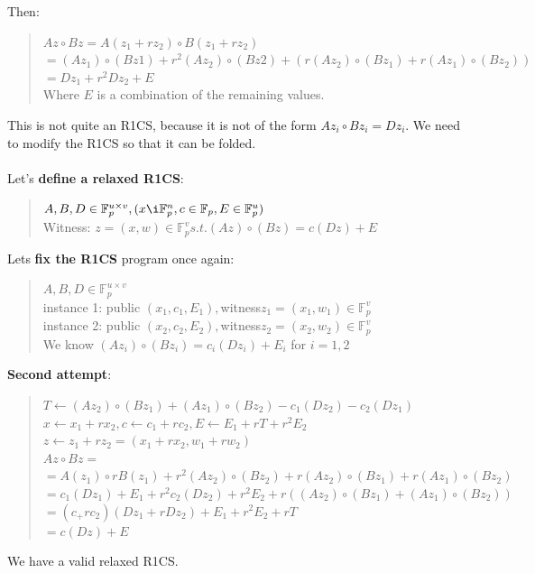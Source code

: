 Then:
\begin{quote}
   $Az \circ Bz = A(z_1 + r z_2) \circ B(z_1 + rz_2)$
   \\
   $= (Az_1) \circ (Bz1) + r^2 (Az_2) \circ (Bz2) + (r(Az_2) \circ (Bz_1) + r(Az_1) \circ (Bz_2))$
   \\
   $=Dz_1 + r^2Dz_2 + E$
   \\
   Where $E$ is a combination of the remaining values.
   \\
\end{quote}
This is not quite an R1CS, because it is not of the form $Az_i \circ Bz_i = Dz_i$.
We need to modify the R1CS so that it can be folded.
\\
\\
Let's \textbf{define a relaxed R1CS}:
\begin{quote}
$A, B,D \in \mathbb{F}^{u \times v}_p, (x \i  \mathbb{F}^n_p, c \in \mathbb{F}_p, E \in \mathbb{F}^u_p) $
\\
Witness: $ z = (x,w) \in \mathbb{F}^v_p s.t. (Az) \circ (Bz) = c(Dz) + E$
\end{quote}
Lets \textbf{fix the R1CS} program once again:
\begin{quote}
$A,B,D \in \mathbb{F}^{u \times v}_p $
\\
instance 1: public $ (x_1,c_1,E_1), $witness$ z_1 = (x_1, w_1) \in \mathbb{F}^v_p$
\\
instance 2: public $(x_2,c_2,E_2), $witness$  z_2 = (x_2, w_2) \in \mathbb{F}^v_p$
\\
We know $(Az_i) \circ (Bz_i) = c_i(Dz_i) + E_i$ for $ i = 1,2$
\end{quote}


\textbf{Second attempt}:
\begin{quote}
$T \leftarrow (Az_2) \circ (Bz_1) + (Az_1) \circ (Bz_2) - c_1(Dz_2) - c_2(Dz_1)$
\\
$x \leftarrow x_1 + rx_2, c \leftarrow c_1 + rc_2, E \leftarrow E_1 + rT +r^2E_2$
\\
$z \leftarrow z_1 + rz_2 = (x_1 +rx_2, w_1 + rw_2)$
\\
$Az \circ Bz = $
\\
$=A(z_1) \circ rB(z_1) +r^2(Az_2) \circ (Bz_2) + r(Az_2) \circ (Bz_1) + r(Az_1) \circ (Bz_2)$
\\
$=c_1(Dz_1) + E_1 + r^2c_2(Dz_2) + r^2E_2+r((Az_2) \circ (Bz_1) + (Az_1) \circ (Bz_2))$
\\
$=(c_+rc_2)(Dz_1+rDz_2)+E_1+r^2E_2+rT$
\\
$=c(Dz) + E$
\end{quote}
We have a valid relaxed R1CS.\cite{ZKM10} \cite{FG23}

